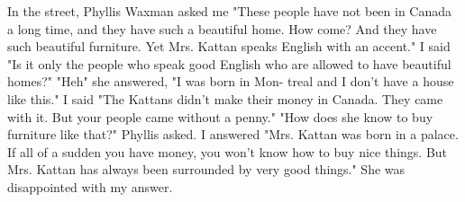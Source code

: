 In the street, Phyllis Waxman asked me "These people have not been in Canada a long time, and they have such a beautiful home. How come? And 
they have such beautiful furniture. Yet Mrs. Kattan speaks English with 
an accent." I said "Is it only the people who speak good English who are 
allowed to have beautiful homes?" "Heh" she answered, "I was born in Mon-
treal and I don't have a house like this." I said "The Kattans didn't make 
their money in Canada. They came with it. But your people came 
without a penny." "How does she know to buy furniture like that?" Phyllis 
asked. I answered "Mrs. Kattan was born in a palace. If all of a sudden 
you have money, you won't know how to buy nice things. But Mrs. Kattan 
has always been surrounded by very good things." She was disappointed 
with my answer.
